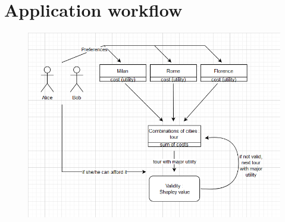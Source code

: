 \documentclass{article}
\begin{document}
\section{Application workflow}
\begin{figure}[htbp!]
\centering
  \includegraphics[width=\linewidth]{workflow.png}
  \label{fig:workflow}
\end{figure}
\newpage
\end{document}
